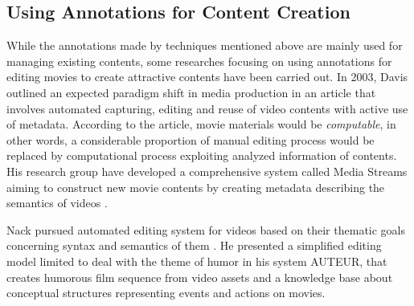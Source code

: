 \subsection{Using Annotations for Content Creation}
While the annotations made by techniques mentioned above are mainly used for managing existing contents, some researches focusing on using annotations for editing movies to create attractive contents have been carried out. %
In 2003, Davis outlined an expected paradigm shift in media production in an article \cite{davis2003editing} that involves automated capturing, editing and reuse of video contents with active use of metadata.
According to the article, movie materials would be {\it computable}, in other words, a considerable proportion of manual editing process would be replaced by computational process exploiting analyzed information of contents.
His research group have developed a comprehensive system called Media Streams aiming to construct new movie contents by creating metadata describing the semantics of videos \cite{davis2000media}.

Nack pursued automated editing system for videos based on their thematic goals concerning syntax and semantics of them \cite{nack1997application}.
He presented a simplified editing model limited to deal with the theme of humor in his system AUTEUR, that creates humorous film sequence from video assets and a knowledge base about conceptual structures representing events and actions on movies.
